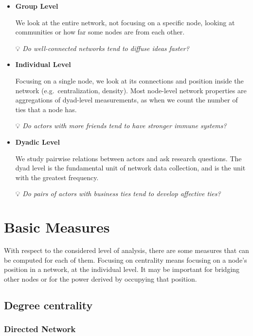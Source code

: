 \documentclass[
  notitlepage,
  onecolumn,
  openany]{book}
\begin{document}
\begin{itemize}
\item
  \textbf{Group Level}

  We look at the entire network, not focusing on a specific node, looking at communities or how far some nodes are from each other.

  💡 \emph{Do well-connected networks tend to diffuse ideas faster?}
\item
  \textbf{Individual Level}

  Focusing on a single node, we look at its connections and position inside the network (e.g.~centralization, density). Most node-level network properties are aggregations of dyad-level measurements, as when we count the number of ties that a node has.

  💡 \emph{Do actors with more friends tend to have stronger immune systems?}
\item
  \textbf{Dyadic Level}

  We study pairwise relations between actors and ask research questions. The dyad level is the fundamental unit of network data collection, and is the unit with the greatest frequency.

  💡 \emph{Do pairs of actors with business ties tend to develop affective ties?}
\end{itemize}

\hypertarget{basic-measures}{%
\chapter{Basic Measures}\label{basic-measures}}

With respect to the considered level of analysis, there are some measures that can be computed for each of them. Focusing on centrality means focusing on a node's position in a network, at the individual level. It may be important for bridging other nodes or for the power derived by occupying that position.

\hypertarget{degree-centrality}{%
\section{Degree centrality}\label{degree-centrality}}

\hypertarget{directed-network}{%
\subsection{Directed Network}\label{directed-network}}
\end{document}
